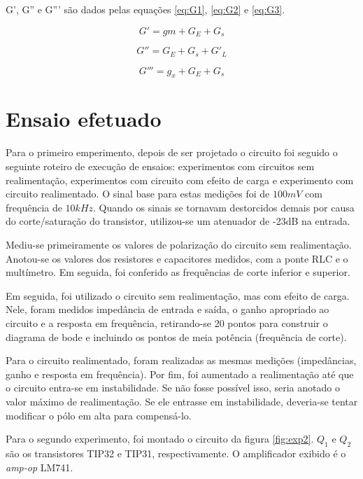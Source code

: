 \documentclass[openright]{normas-utf-tex} %
\begin{document}
G', G'' e G''' são dados pelas equações \ref{eq:G1}, \ref{eq:G2} e \ref{eq:G3}.

\begin{equation}\label{eq:G1}
G'= gm+G_E+G_s
\end{equation}


\begin{equation}\label{eq:G2}
G''= G_E+G_s + G'_L
\end{equation}


\begin{equation}\label{eq:G3}
G'''= g_x+G_E+G_s
\end{equation}



\section{Ensaio efetuado}
\label{sec:ensaio}
Para o primeiro emperimento, depois de ser projetado o circuito foi seguido o seguinte roteiro de execução de ensaios: experimentos com circuitos sem realimentação, experimentos com circuito com efeito de carga e experimento com circuito realimentado. O sinal base para estas medições foi de $100mV$ com frequência de $10kHz$. Quando os sinais se tornavam destorcidos demais por causa do corte/saturação do transistor, utilizou-se um atenuador de -23dB na entrada.

Mediu-se primeiramente os valores de polarização do circuito sem realimentação. Anotou-se os valores dos resistores e capacitores medidos, com a ponte RLC e o multímetro. Em seguida, foi conferido as frequências de corte inferior e superior.

Em seguida, foi utilizado o circuito sem realimentação, mas com efeito de carga. Nele, foram medidos impedância de entrada e saída, o ganho apropriado ao circuito e a resposta em frequência, retirando-se 20 pontos para construir o diagrama de bode e incluindo os pontos de meia potência (frequência de corte).

Para o circuito realimentado, foram realizadas as mesmas medições (impedâncias, ganho e resposta em frequência). Por fim, foi aumentado a realimentação até que o circuito entra-se em instabilidade. Se não fosse possível isso, seria anotado o valor máximo de  realimentação. Se ele entrasse em instabilidade, deveria-se tentar modificar o pólo em alta para compensá-lo.

Para o segundo experimento, foi montado o circuito da figura \ref{fig:exp2}. $Q_1$ e $Q_2$ são os transistores TIP32 e TIP31, respectivamente. O amplificador exibido é o \textit{amp-op} LM741. 
\end{document}
